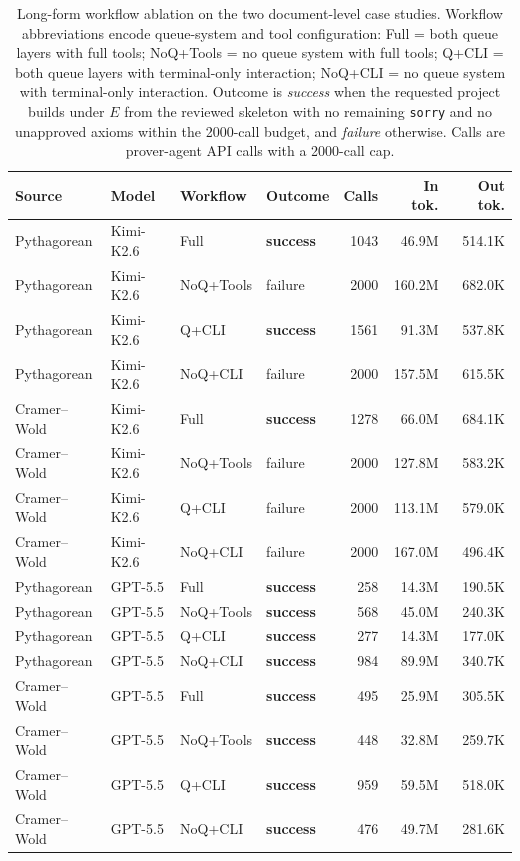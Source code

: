 \documentclass{article}
\newcommand{\kimi}{Kimi-K2.6\xspace}
\newcommand{\gpt}{GPT-5.5\xspace}
\begin{document}
\begin{table}[t]
\centering
\caption{Long-form workflow ablation on the two document-level case studies. Workflow abbreviations encode queue-system and tool configuration: Full = both queue layers with full tools; NoQ+Tools = no queue system with full tools; Q+CLI = both queue layers with terminal-only interaction; NoQ+CLI = no queue system with terminal-only interaction. Outcome is \emph{success} when the requested project builds under $E$ from the reviewed skeleton with no remaining \texttt{sorry} and no unapproved axioms within the 2000-call budget, and \emph{failure} otherwise. Calls are prover-agent API calls with a 2000-call cap.}
\label{tab:longform-ablation}
\footnotesize
\setlength{\tabcolsep}{3pt}
\begin{tabular*}{\textwidth}{@{\extracolsep{\fill}}llllrrr@{}}
\toprule
Source & Model & Workflow & Outcome & Calls & In tok. & Out tok. \\
\midrule
Pythagorean & \kimi & Full & \textbf{success} & 1043 & 46.9M & 514.1K \\
Pythagorean & \kimi & NoQ+Tools & failure & 2000 & 160.2M & 682.0K \\
Pythagorean & \kimi & Q+CLI & \textbf{success} & 1561 & 91.3M & 537.8K \\
Pythagorean & \kimi & NoQ+CLI & failure & 2000 & 157.5M &  615.5K \\
Cramer--Wold & \kimi & Full & \textbf{success} & 1278 & 66.0M & 684.1K \\
Cramer--Wold & \kimi & NoQ+Tools & failure & 2000 & 127.8M & 583.2K \\
Cramer--Wold & \kimi & Q+CLI & failure & 2000 & 113.1M & 579.0K \\
Cramer--Wold & \kimi & NoQ+CLI & failure & 2000 & 167.0M  & 496.4K \\
\midrule
Pythagorean & \gpt & Full & \textbf{success} & 258 & 14.3M & 190.5K \\
Pythagorean & \gpt & NoQ+Tools & \textbf{success} & 568 & 45.0M & 240.3K \\
Pythagorean & \gpt & Q+CLI & \textbf{success} & 277 & 14.3M & 177.0K \\
Pythagorean & \gpt & NoQ+CLI & \textbf{success} & 984 & 89.9M & 340.7K \\
Cramer--Wold & \gpt & Full & \textbf{success} & 495 & 25.9M  & 305.5K\\
Cramer--Wold & \gpt & NoQ+Tools & \textbf{success} & 448 & 32.8M & 259.7K \\
Cramer--Wold & \gpt & Q+CLI & \textbf{success} & 959 & 59.5M & 518.0K \\
Cramer--Wold & \gpt & NoQ+CLI & \textbf{success} & 476 & 49.7M & 281.6K \\
\bottomrule
\end{tabular*}
\end{table}
\end{document}
